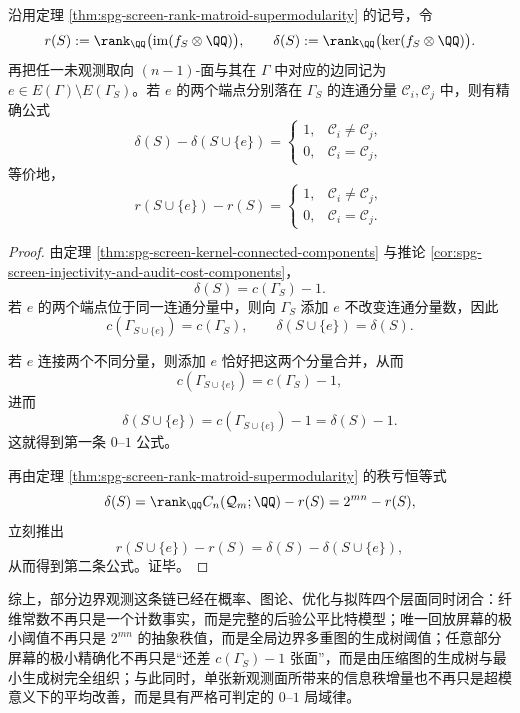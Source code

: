 \begin{theorem}\label{thm:xi-time-part65f-single-face-zero-one-marginal-law}
沿用定理 \ref{thm:spg-screen-rank-matroid-supermodularity} 的记号，令
\[
r(S):=\rank_{\QQ}\bigl(\operatorname{im}(f_S\otimes\QQ)\bigr),
\qquad
\delta(S):=\rank_{\QQ}\bigl(\ker(f_S\otimes\QQ)\bigr).
\]
再把任一未观测取向 \((n-1)\)-面与其在 \(\Gamma\) 中对应的边同记为 \(e\in E(\Gamma)\setminus E(\Gamma_S)\)。若 \(e\) 的两个端点分别落在 \(\Gamma_S\) 的连通分量 \(\mathcal C_i,\mathcal C_j\) 中，则有精确公式
\[
\delta(S)-\delta(S\cup\{e\})
=
\begin{cases}
1,& \mathcal C_i\neq \mathcal C_j,\\[4pt]
0,& \mathcal C_i=\mathcal C_j,
\end{cases}
\]
等价地，
\[
r(S\cup\{e\})-r(S)
=
\begin{cases}
1,& \mathcal C_i\neq \mathcal C_j,\\[4pt]
0,& \mathcal C_i=\mathcal C_j.
\end{cases}
\]
\end{theorem}
\begin{proof}
由定理 \ref{thm:spg-screen-kernel-connected-components} 与推论 \ref{cor:spg-screen-injectivity-and-audit-cost-components}，
\[
\delta(S)=c(\Gamma_S)-1.
\]
若 \(e\) 的两个端点位于同一连通分量中，则向 \(\Gamma_S\) 添加 \(e\) 不改变连通分量数，因此
\[
c(\Gamma_{S\cup\{e\}})=c(\Gamma_S),
\qquad
\delta(S\cup\{e\})=\delta(S).
\]

若 \(e\) 连接两个不同分量，则添加 \(e\) 恰好把这两个分量合并，从而
\[
c(\Gamma_{S\cup\{e\}})=c(\Gamma_S)-1,
\]
进而
\[
\delta(S\cup\{e\})=c(\Gamma_{S\cup\{e\}})-1=\delta(S)-1.
\]
这就得到第一条 \(0\text{--}1\) 公式。

再由定理 \ref{thm:spg-screen-rank-matroid-supermodularity} 的秩亏恒等式
\[
\delta(S)=\rank_{\QQ}C_n(\mathcal Q_m;\QQ)-r(S)
=
2^{mn}-r(S),
\]
立刻推出
\[
r(S\cup\{e\})-r(S)=\delta(S)-\delta(S\cup\{e\}),
\]
从而得到第二条公式。证毕。
\end{proof}

\noindent
综上，部分边界观测这条链已经在概率、图论、优化与拟阵四个层面同时闭合：纤维常数不再只是一个计数事实，而是完整的后验公平比特模型；唯一回放屏幕的极小阈值不再只是 \(2^{mn}\) 的抽象秩值，而是全局边界多重图的生成树阈值；任意部分屏幕的极小精确化不再只是“还差 \(c(\Gamma_S)-1\) 张面”，而是由压缩图的生成树与最小生成树完全组织；与此同时，单张新观测面所带来的信息秩增量也不再只是超模意义下的平均改善，而是具有严格可判定的 \(0\text{--}1\) 局域律。

\endinput
